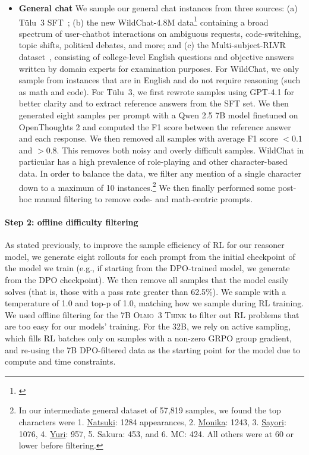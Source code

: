 \documentclass[table]{ai2style/ai2}
\newcommand{\tulu}{T\"ulu~3\xspace}
\newcommand{\olmothreethinking}{\textsc{Olmo~3 Think}\xspace}
\begin{document}
\begin{itemize}
    \item {\bf{General chat}} We sample our general chat instances from three sources: (a) \tulu SFT~\citep{lambert2024tulu3}; (b) the new WildChat-4.8M data\footnote{\href{https://huggingface.co/datasets/allenai/WildChat-4.8M}{}} containing a broad spectrum of user-chatbot interactions on ambiguous requests, code-switching, topic shifts, political debates, and more; and (c) the Multi-subject-RLVR dataset~\citep{su2025expanding}, consisting of college-level English questions and objective answers written by domain experts for examination purposes.
    For WildChat, we only sample from instances that are in English and do not require reasoning (such as math and code).
    For \tulu, we first rewrote samples using GPT-4.1 for better clarity and to extract reference answers from the SFT set.
    We then generated eight samples per prompt with a Qwen 2.5 7B model finetuned on OpenThoughts 2 and computed the F1 score between the reference answer and each response.
    We then removed all samples with average F1 score $<0.1$ and $>0.8$.
    This removes both noisy and overly difficult samples.
    WildChat in particular has a high prevalence of role-playing and other character-based data.
    In order to balance the data, we filter any mention of a single character down to a maximum of 10 instances.\footnote{In our intermediate general dataset of 57,819 samples, we found the top characters were   1. \href{https://doki-doki-literature-club.fandom.com/wiki/Natsuki_(DDLC)}{Natsuki}: 1284 appearances, 2. \href{https://doki-doki-literature-club.fandom.com/wiki/Monika_(DDLC)}{Monika}: 1243, 3. \href{https://doki-doki-literature-club.fandom.com/wiki/Sayori_(DDLC)}{Sayori}: 1076, 4. \href{https://doki-doki-literature-club.fandom.com/wiki/Yuri_(DDLC)}{Yuri}: 957, 5. Sakura: 453, and 6. MC: 424. All others were at 60 or lower before filtering.}
    We then finally performed some post-hoc manual filtering to remove code- and math-centric prompts.

\end{itemize}

\paragraph{Step 2: offline difficulty filtering}
As stated previously, to improve the sample efficiency of RL for our reasoner model, we generate eight rollouts for each prompt from the initial checkpoint of the model we train (e.g., if starting from the DPO-trained model, we generate from the DPO checkpoint). We then remove all samples that the model easily solves (that is, those with a pass rate greater than 62.5\%).
We sample with a temperature of 1.0 and top-p of 1.0, matching how we sample during RL training.
We used offline filtering for the 7B \olmothreethinking to filter out RL problems that are too easy for our models' training.
For the 32B, we rely on active sampling, which fills RL batches only on samples with a non-zero GRPO group gradient, and re-using the 7B DPO-filtered data as the starting point for the model due to compute and time constraints.
\end{document}

